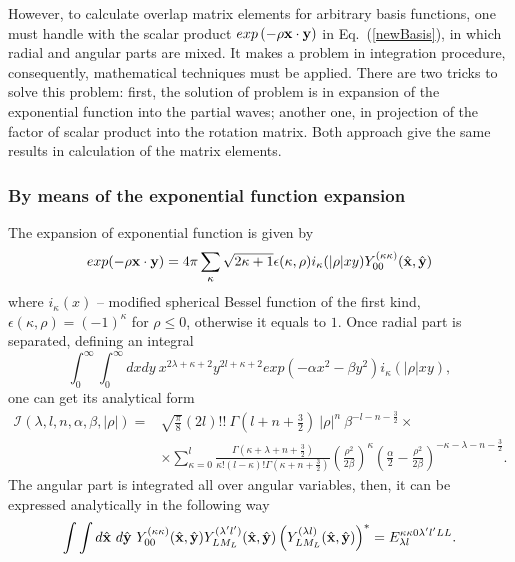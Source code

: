 \documentclass[12pt,a4paper,twoside]{article}
\begin{document}
However, to calculate overlap matrix elements for arbitrary basis functions, one must handle with the scalar product $exp\left(- \rho {\bf x} \cdot {\bf y} \right)$ in  Eq.~(\ref{newBasis}), in which radial and angular parts are mixed. It makes a problem in integration procedure, consequently, mathematical techniques must be applied. There are two tricks to solve this problem:  first, the solution of problem is in expansion of  the exponential function into the partial waves; another one, in projection of the factor of scalar product into the rotation matrix. Both approach give the same results in calculation of the matrix elements.
\subsubsection{By means of the  exponential function expansion}
The expansion of exponential function is given by 
\begin{equation}
exp(-\rho {\bf x} \cdot {\bf y}) = 4 \pi \sum_{\kappa} \sqrt{2\kappa+1} 
\epsilon(\kappa, \rho)i_{\kappa}(|\rho|xy)Y_{00}^{(\kappa\kappa)}(\hat{{\bf x}},\hat{{\bf y}})
\end{equation} 
where $i_{\kappa}(x) $ -- modified spherical Bessel function of the first kind, $\epsilon(\kappa, \rho)=(-1)^{\kappa}$ for $\rho \le 0$, otherwise it equals to $1$.
Once radial part is separated, defining an integral
\begin{equation}
\int_0^\infty \int_0^\infty  dx dy~ x^{2\lambda+\kappa+2}y^{2 l +\kappa+2} exp\left( -\alpha x^2 - \beta y^2 \right) i_{\kappa}(|\rho|xy),
\end{equation}
one can get its analytical form
\begin{align}
\mathcal{I}(\lambda, l, n, \alpha, \beta, |\rho|) =& \sqrt{\frac{\pi}{8}}(2l)!!~ \Gamma(l+n+\tfrac{3}{2})~|\rho|^{n} ~\beta^{-l-n-\tfrac{3}{2}} \times \nonumber \\
& \times \sum_{\kappa=0}^{l} \frac{\Gamma(\kappa+\lambda+n+\tfrac{3}{2})}{\kappa! (l-\kappa)! \Gamma(\kappa+n+\tfrac{3}{2})}
\left(\frac{\rho^2}{2\beta}\right)^{\kappa} \left( \frac{\alpha}{2} - \frac{\rho^2}{2\beta}  \right)^{-\kappa-\lambda-n-\tfrac{3}{2}}.
\end{align}
The angular part is integrated all over angular variables, then,  it can be expressed analytically in the following way
\begin{equation}
\int \int d\hat{\bf x}~d\hat{\bf y}~ Y_{00}^{(\kappa\kappa)}(\hat{{\bf x}},\hat{{\bf y}})  Y_{LM_L}^{(\lambda^{\prime} l^{\prime})}(\hat{{\bf x}},\hat{{\bf y}}) \left(  Y_{LM_L}^{(\lambda l)}(\hat{{\bf x}},\hat{{\bf y}}) \right)^{*} = {E}^{\kappa \kappa 0 \lambda^{\prime} l^{\prime} L L}_{\lambda l}.
\end{equation}
\end{document}
